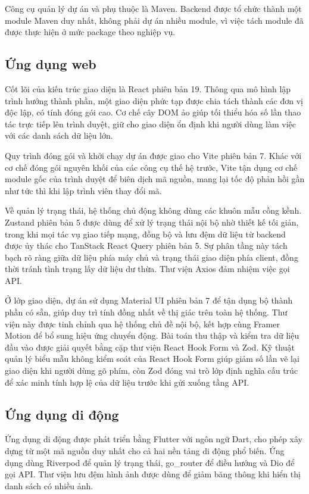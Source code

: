 \documentclass[12pt,a4paper,oneside]{report}
\begin{document}
Công cụ quản lý dự án và phụ thuộc là Maven. Backend được tổ chức thành một module Maven duy nhất, không phải dự án nhiều module, vì việc tách module đã được thực hiện ở mức package theo nghiệp vụ.

\subsection{Ứng dụng web}

Cốt lõi của kiến trúc giao diện là React phiên bản 19. Thông qua mô hình lập trình hướng thành phần, một giao diện phức tạp được chia tách thành các đơn vị độc lập, có tính đóng gói cao. Cơ chế cây DOM ảo giúp tối thiểu hóa số lần thao tác trực tiếp lên trình duyệt, giữ cho giao diện ổn định khi người dùng làm việc với các danh sách dữ liệu lớn.

Quy trình đóng gói và khởi chạy dự án được giao cho Vite phiên bản 7. Khác với cơ chế đóng gói nguyên khối của các công cụ thế hệ trước, Vite tận dụng cơ chế module gốc của trình duyệt để biên dịch mã nguồn, mang lại tốc độ phản hồi gần như tức thì khi lập trình viên thay đổi mã.

Về quản lý trạng thái, hệ thống chủ động không dùng các khuôn mẫu cồng kềnh. Zustand phiên bản 5 được dùng để xử lý trạng thái nội bộ nhờ thiết kế tối giản, trong khi mọi tác vụ giao tiếp mạng, đồng bộ và lưu đệm dữ liệu từ backend được ủy thác cho TanStack React Query phiên bản 5. Sự phân tầng này tách bạch rõ ràng giữa dữ liệu phía máy chủ và trạng thái giao diện phía client, đồng thời tránh tình trạng lấy dữ liệu dư thừa. Thư viện Axios đảm nhiệm việc gọi API.

Ở lớp giao diện, dự án sử dụng Material UI phiên bản 7 để tận dụng bộ thành phần có sẵn, giúp duy trì tính đồng nhất về thị giác trên toàn hệ thống. Thư viện này được tinh chỉnh qua hệ thống chủ đề nội bộ, kết hợp cùng Framer Motion để bổ sung hiệu ứng chuyển động. Bài toán thu thập và kiểm tra dữ liệu đầu vào được giải quyết bằng cặp thư viện React Hook Form và Zod. Kỹ thuật quản lý biểu mẫu không kiểm soát của React Hook Form giúp giảm số lần vẽ lại giao diện khi người dùng gõ phím, còn Zod đóng vai trò lớp định nghĩa cấu trúc để xác minh tính hợp lệ của dữ liệu trước khi gửi xuống tầng API.

\subsection{Ứng dụng di động}

Ứng dụng di động được phát triển bằng Flutter với ngôn ngữ Dart, cho phép xây dựng từ một mã nguồn duy nhất cho cả hai nền tảng di động phổ biến. Ứng dụng dùng Riverpod để quản lý trạng thái, go\_router để điều hướng và Dio để gọi API. Thư viện lưu đệm hình ảnh được dùng để giảm băng thông khi hiển thị danh sách có nhiều ảnh.
\end{document}
